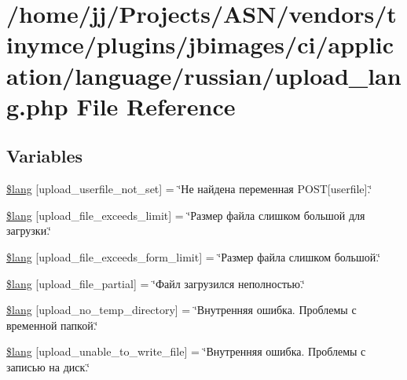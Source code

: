 \hypertarget{application_2language_2russian_2upload__lang_8php}{}\section{/home/jj/\+Projects/\+A\+S\+N/vendors/tinymce/plugins/jbimages/ci/application/language/russian/upload\+\_\+lang.php File Reference}
\label{application_2language_2russian_2upload__lang_8php}
\subsection*{Variables}
\begin{DoxyCompactItemize}
\item 
\hyperlink{application_2language_2russian_2upload__lang_8php_a6d12ff4074b1e4c6f22a4a5107fae5ee}{\$lang} \mbox{[}\textquotesingle{}upload\+\_\+userfile\+\_\+not\+\_\+set\textquotesingle{}\mbox{]} = \char`\"{}Не найдена переменная P\+O\+ST\mbox{[}userfile\mbox{]}.\char`\"{}
\item 
\hyperlink{application_2language_2russian_2upload__lang_8php_a9028f049ebbe292a27e0e2b2e5f7d660}{\$lang} \mbox{[}\textquotesingle{}upload\+\_\+file\+\_\+exceeds\+\_\+limit\textquotesingle{}\mbox{]} = \char`\"{}Размер файла слишком большой для загрузки.\char`\"{}
\item 
\hyperlink{application_2language_2russian_2upload__lang_8php_af6f65d563af150d50dfc6957079fd529}{\$lang} \mbox{[}\textquotesingle{}upload\+\_\+file\+\_\+exceeds\+\_\+form\+\_\+limit\textquotesingle{}\mbox{]} = \char`\"{}Размер файла слишком большой.\char`\"{}
\item 
\hyperlink{application_2language_2russian_2upload__lang_8php_a79751b02ce35007a90bd9052f83deed9}{\$lang} \mbox{[}\textquotesingle{}upload\+\_\+file\+\_\+partial\textquotesingle{}\mbox{]} = \char`\"{}Файл загрузился неполностью.\char`\"{}
\item 
\hyperlink{application_2language_2russian_2upload__lang_8php_ac7144f4992346816875bac28488ef715}{\$lang} \mbox{[}\textquotesingle{}upload\+\_\+no\+\_\+temp\+\_\+directory\textquotesingle{}\mbox{]} = \char`\"{}Внутренняя ошибка. Проблемы с временной папкой.\char`\"{}
\item 
\hyperlink{application_2language_2russian_2upload__lang_8php_a620b622468d4e7781fed6316440c85e7}{\$lang} \mbox{[}\textquotesingle{}upload\+\_\+unable\+\_\+to\+\_\+write\+\_\+file\textquotesingle{}\mbox{]} = \char`\"{}Внутренняя ошибка. Проблемы с записью на диск.\char`\"{}

\end{DoxyCompactItemize}
